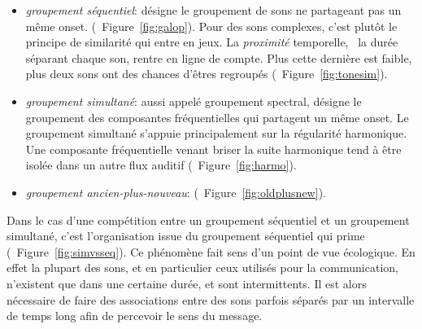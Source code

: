 \begin{itemize}
\item \emph{groupement séquentiel}: désigne le groupement de sons ne partageant pas un même onset.   (\Cf~Figure~\ref{fig:galop}). Pour des sons complexes, c'est plutôt le principe de similarité qui entre en jeux. La \emph{proximité} temporelle, \ie~la durée séparant chaque son, rentre   en ligne de compte. Plus cette dernière est faible, plus deux sons ont des chances d'êtres regroupés (\Cf~Figure~\ref{fig:tonesim}).
\item \emph{groupement simultané}: aussi appelé groupement spectral, désigne le groupement des composantes fréquentielles qui partagent un même onset. Le groupement simultané s'appuie principalement sur la régularité harmonique. Une composante fréquentielle venant briser la suite harmonique tend à être isolée dans un autre flux auditif (\Cf~Figure~\ref{fig:harmo}).
\item \emph{groupement ancien-plus-nouveau}:   (\Cf~Figure~\ref{fig:oldplusnew}).
\end{itemize}

Dans le cas d'une compétition entre un groupement séquentiel et un groupement simultané, c'est l'organisation issue du groupement séquentiel qui prime (\Cf~Figure~\ref{fig:simvsseq}). Ce phénomène fait sens d'un point de vue écologique. En effet la plupart des sons, et en particulier ceux utilisés pour la communication, n'existent que dans une certaine durée, et sont intermittents. Il est alors nécessaire de faire des associations entre des sons parfois séparés par un intervalle de temps long afin de percevoir le sens du message. \citep{winkler2009modeling}

